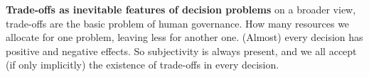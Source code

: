 {    \textbf{Trade-offs as inevitable features of decision problems}
    on a broader view, trade-offs are the basic problem of human governance.
    How many resources we allocate for one problem, leaving less for another one.
    (Almost) every decision has positive and negative effects.
    So subjectivity is always present, and we all accept (if only implicitly) the existence of trade-offs in every decision. 

}
